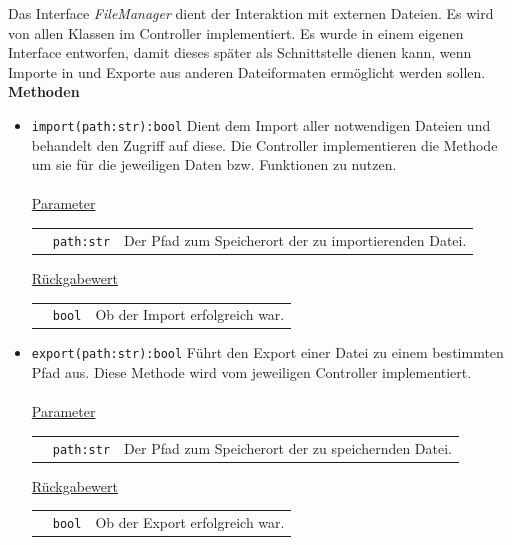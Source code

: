 \documentclass{article}
\begin{document}
\begin{itemize}
Das Interface \textit{FileManager} dient der Interaktion mit externen Dateien. Es wird von allen Klassen im Controller implementiert. Es wurde in einem eigenen Interface entworfen, damit dieses später als Schnittstelle dienen kann, wenn Importe in und Exporte aus anderen Dateiformaten ermöglicht werden sollen.
\newline \newline
\textbf{{Methoden}}
\begin{itemize}
\item \texttt{import(path:str):bool} \newline Dient dem Import aller notwendigen Dateien und behandelt den Zugriff auf diese. Die Controller implementieren die Methode um sie für die jeweiligen Daten bzw. Funktionen zu nutzen.
\\\\
\underline{{Parameter}}

\begin{tabular}{lll}
 & \texttt{path:str} & Der Pfad zum Speicherort der zu importierenden Datei. \\
\end{tabular}

\underline{{Rückgabewert}}

\begin{tabular}{lll}
 & \texttt{bool} & Ob der Import erfolgreich war. \\
\end{tabular}

\item \texttt{export(path:str):bool} \newline Führt den Export einer Datei zu einem bestimmten Pfad aus. Diese Methode wird vom jeweiligen Controller implementiert.
\\\\
\underline{{Parameter}}

\begin{tabular}{lll}
 & \texttt{path:str} & Der Pfad zum Speicherort der zu speichernden Datei. \\
\end{tabular}

\underline{{Rückgabewert}}

\begin{tabular}{lll}
 & \texttt{bool} & Ob der Export erfolgreich war. \\
\end{tabular}
\end{itemize}




\end{itemize}
\end{document}
